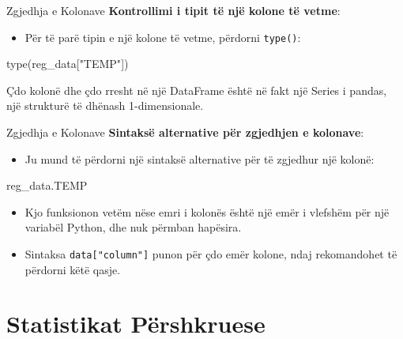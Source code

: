 \documentclass[
  ignorenonframetext,
]{beamer}
\newenvironment{Shaded}{\begin{snugshade}}{\end{snugshade}}
\newcommand{\BuiltInTok}[1]{#1}
\newcommand{\NormalTok}[1]{#1}
\newcommand{\StringTok}[1]{\textcolor[rgb]{0.31,0.60,0.02}{#1}}
\providecommand{\tightlist}{%
  \setlength{\itemsep}{0pt}\setlength{\parskip}{0pt}}
\begin{document}
\begin{frame}[fragile]{Zgjedhja e Kolonave}
\protect\hypertarget{zgjedhja-e-kolonave-4}{}
\textbf{Kontrollimi i tipit të një kolone të vetme}:

\begin{itemize}
\tightlist
\item
  Për të parë tipin e një kolone të vetme, përdorni \texttt{type()}:
\end{itemize}

\begin{Shaded}
\begin{Highlighting}[]
    \BuiltInTok{type}\NormalTok{(reg\_data[}\StringTok{"TEMP"}\NormalTok{])}
\end{Highlighting}
\end{Shaded}

Çdo kolonë dhe çdo rresht në një DataFrame është në fakt një Series i
pandas, një strukturë të dhënash 1-dimensionale.
\end{frame}

\begin{frame}[fragile]{Zgjedhja e Kolonave}
\protect\hypertarget{zgjedhja-e-kolonave-5}{}
\textbf{Sintaksë alternative për zgjedhjen e kolonave}:

\begin{itemize}
\tightlist
\item
  Ju mund të përdorni një sintaksë alternative për të zgjedhur një
  kolonë:
\end{itemize}

\begin{Shaded}
\begin{Highlighting}[]
\NormalTok{    reg\_data.TEMP}
\end{Highlighting}
\end{Shaded}

\begin{itemize}
\item
  Kjo funksionon vetëm nëse emri i kolonës është një emër i vlefshëm për
  një variabël Python, dhe nuk përmban hapësira.
\item
  Sintaksa \texttt{data{[}"column"{]}} punon për çdo emër kolone, ndaj
  rekomandohet të përdorni këtë qasje.
\end{itemize}
\end{frame}

\hypertarget{statistikat-puxebrshkruese}{%
\section{Statistikat Përshkruese}\label{statistikat-puxebrshkruese}}
\end{document}
